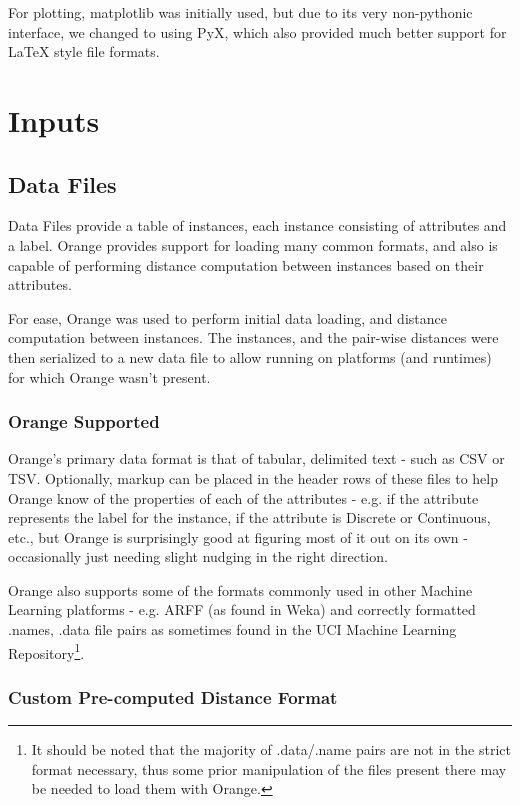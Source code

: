 \documentclass[a4paper,11pt]{report}
\begin{document}
For plotting, matplotlib\cite{prog:matplotlib} was initially used, but due to its very non-pythonic interface, we changed to using PyX\cite{prog:pyx}, which also provided much better support for LaTeX style file formats.

\section{Inputs}
\subsection{Data Files}
Data Files provide a table of instances, each instance consisting of attributes and a label. Orange provides support for loading many common formats, and also is capable of performing distance computation between instances based on their attributes.

For ease, Orange was used to perform initial data loading, and distance computation between instances. The instances, and the pair-wise distances were then serialized to a new data file to allow running on platforms (and runtimes) for which Orange wasn't present.

\subsubsection{Orange Supported}
Orange's primary data format is that of tabular, delimited text - such as CSV or TSV. Optionally, markup can be placed in the header rows of these files to help Orange know of the properties of each of the attributes - e.g. if the attribute represents the label for the instance, if the attribute is Discrete or Continuous, etc., but Orange is surprisingly good at figuring most of it out on its own - occasionally just needing slight nudging in the right direction.

Orange also supports some of the formats commonly used in other Machine Learning platforms - e.g. ARFF (as found in Weka) and correctly formatted .names, .data file pairs as sometimes found in the UCI Machine Learning Repository\cite{web:uci}\footnote{It should be noted that the majority of .data/.name pairs are not in the strict format necessary, thus some prior manipulation of the files present there may be needed to load them with Orange.}.

\subsubsection{Custom Pre-computed Distance Format}
\end{document}

